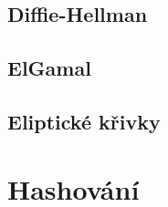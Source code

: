 \documentclass[10pt,a4paper]{article}
\begin{document}
\subsection{Diffie-Hellman}
\subsection{ElGamal}
\subsection{Eliptické křivky}

\section{Hashování}
\end{document}
